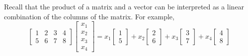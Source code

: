\documentclass{ximera}
\begin{document}
Recall that the product of a matrix and a vector can be interpreted as a linear combination of the columns of the matrix.  For example,
$$\begin{bmatrix}1&2&3&4\\5&6&7&8\end{bmatrix}\begin{bmatrix}x_1\\x_2\\x_3\\x_4\end{bmatrix}=x_1\begin{bmatrix}1\\5\end{bmatrix}+x_2\begin{bmatrix}2\\6\end{bmatrix}+x_3\begin{bmatrix}3\\7\end{bmatrix}+x_4\begin{bmatrix}4\\8\end{bmatrix}$$
\end{document}
